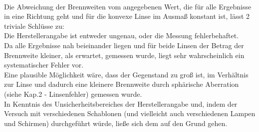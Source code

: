 \documentclass[12pt,a4paper]{article}
\begin{document}
\begin{multicols}{2}
\\
Die Abweichung der Brennweiten vom angegebenen Wert, die für alle Ergebnisse in eine Richtung geht und für die konvexe Linse im Ausmaß konstant ist, lässt 2 triviale Schlüsse zu: \\
Die Herstellerangabe ist entweder ungenau, oder die Messung fehlerbehaftet.\\
Da alle Ergebnisse nah beieinander liegen und für beide Linsen der Betrag der Brennweite kleiner, als erwartet, gemessen wurde, liegt sehr wahrscheinlich ein systematischer Fehler vor. \\
Eine plausible Möglichkeit wäre, dass der Gegenstand zu groß ist, im Verhältnis zur Linse und dadurch eine kleinere Brennweite durch sphärische Aberration (siehe Kap.2 - Linsenfehler) gemessen wurde.\\
In Kenntnis des Unsicherheitsbereiches der Herstellerangabe und, indem der Versuch mit verschiedenen Schablonen (und vielleicht auch verschiedenen Lampen und Schirmen) durchgeführt würde, ließe sich dem auf den Grund gehen.



\end{multicols}
\end{document}
